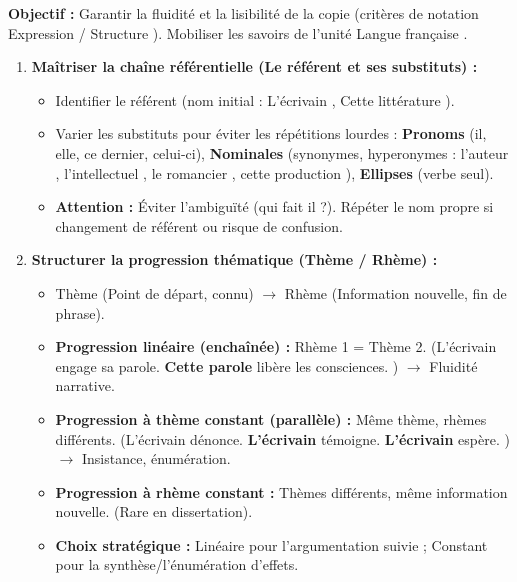 \documentclass[11pt]{article}
\newcommand{\cle}[1]{{\popxbold\color{popdark}#1}}
\begin{document}
\begin{methode}
    \textbf{Objectif :} Garantir la fluidité et la lisibilité de la copie (critères de notation \og Expression \fg / \og Structure \fg). Mobiliser les savoirs de l'unité \og Langue française \fg.
    \begin{enumerate}
        \item \textbf{Maîtriser la chaîne référentielle (Le référent et ses substituts) :}
            \begin{itemize}
                \item Identifier le \cle{référent} (nom initial : \og L'écrivain \fg, \og Cette littérature \fg).
                \item Varier les \cle{substituts} pour éviter les répétitions lourdes : \textbf{Pronoms} (il, elle, ce dernier, celui-ci), \textbf{Nominales} (synonymes, hyperonymes : \og l'auteur \fg, \og l'intellectuel \fg, \og le romancier \fg, \og cette production \fg), \textbf{Ellipses} (verbe seul).
                \item \textbf{Attention :} Éviter l'ambiguïté (qui fait \og il \fg ?). Répéter le nom propre si changement de référent ou risque de confusion.
            \end{itemize}
        \item \textbf{Structurer la progression thématique (Thème / Rhème) :}
            \begin{itemize}
                \item \cle{Thème} (Point de départ, connu) $\rightarrow$ \cle{Rhème} (Information nouvelle, fin de phrase).
                \item \textbf{Progression linéaire (enchaînée) :} Rhème 1 = Thème 2. (\og L'écrivain engage sa parole. \textbf{Cette parole} libère les consciences. \fg) $\rightarrow$ Fluidité narrative.
                \item \textbf{Progression à thème constant (parallèle) :} Même thème, rhèmes différents. (\og L'écrivain dénonce. \textbf{L'écrivain} témoigne. \textbf{L'écrivain} espère. \fg) $\rightarrow$ Insistance, énumération.
                \item \textbf{Progression à rhème constant :} Thèmes différents, même information nouvelle. (Rare en dissertation).
                \item \textbf{Choix stratégique :} Linéaire pour l'argumentation suivie ; Constant pour la synthèse/l'énumération d'effets.

\end{itemize}
\end{enumerate}
\end{methode}
\end{document}
